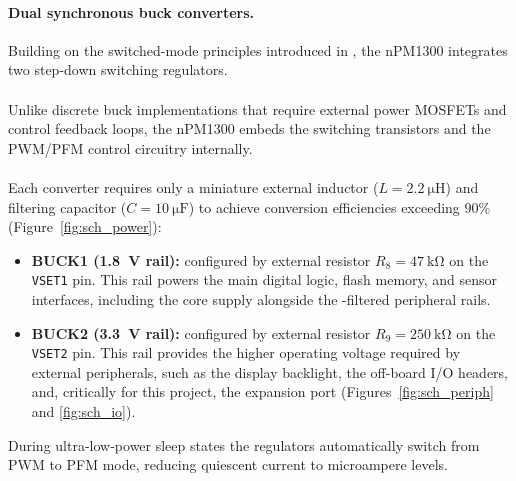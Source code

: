 \documentclass[12pt, a4paper]{article}
\begin{document}
\paragraph{Dual synchronous buck converters.}
Building on the switched-mode principles introduced in
, the nPM1300 integrates two step-down switching
regulators.\\\\
Unlike discrete buck implementations that require external power
MOSFETs and control feedback loops, the nPM1300 embeds the switching transistors
and the PWM/PFM control circuitry internally.\\\\
Each converter requires only a
miniature external inductor ($L = \SI{2.2}{\micro\henry}$) and filtering
capacitor ($C = \SI{10}{\micro\farad}$) to achieve conversion efficiencies
exceeding $90\%$ (Figure~\ref{fig:sch_power}):
\begin{itemize}
    \item \textbf{BUCK1 (\SI{1.8}{\volt} rail):} configured by external resistor $R_8 = \SI{47}{\kilo\ohm}$ on the \texttt{VSET1} pin. This rail powers the main digital logic, flash memory, and sensor interfaces, including the  core supply alongside the -filtered peripheral rails.
    \item \textbf{BUCK2 (\SI{3.3}{\volt} rail):} configured by external resistor $R_9 = \SI{250}{\kilo\ohm}$ on the \texttt{VSET2} pin. 
    This rail provides the higher operating voltage required by external peripherals, such as the display backlight, the off-board I/O headers, and, critically for this project, the expansion port (Figures~\ref{fig:sch_periph} and \ref{fig:sch_io}).
\end{itemize}
During ultra-low-power sleep states the regulators automatically switch from PWM
to PFM mode, reducing quiescent current to microampere levels.
\end{document}
